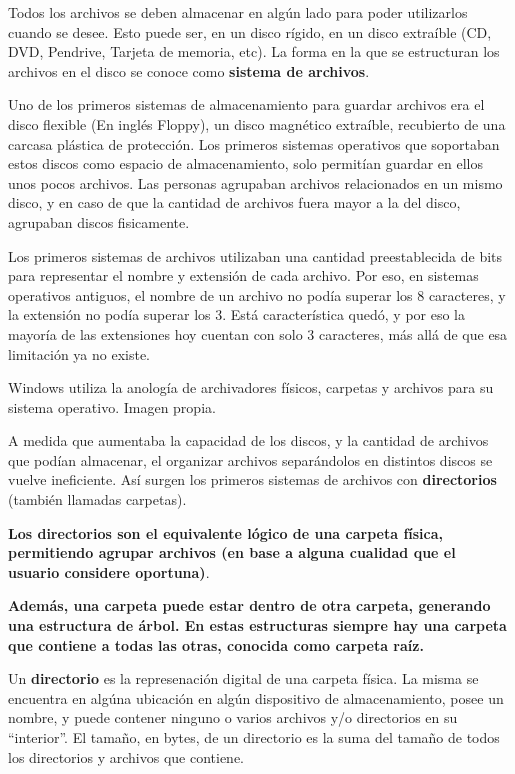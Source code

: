 Todos los archivos se deben almacenar en algún lado para poder utilizarlos
cuando se desee. Esto puede ser, en un disco rígido, en un disco extraíble
(CD, DVD, Pendrive, Tarjeta de memoria, etc). La forma en la que se estructuran
los archivos en el disco se conoce como \textbf{sistema de archivos}.

Uno de los primeros sistemas de almacenamiento para guardar archivos era el
disco flexible (En inglés Floppy), un disco magnético extraíble, recubierto de
una carcasa plástica de protección. Los primeros sistemas operativos que soportaban
estos discos como espacio de almacenamiento, solo permitían guardar en ellos unos
pocos archivos. Las personas agrupaban archivos relacionados en un mismo disco,
y en caso de que la cantidad de archivos fuera mayor a la del disco, agrupaban
discos fisicamente.

\begin{knowwhat}
Los primeros sistemas de archivos utilizaban una cantidad preestablecida de
bits para representar el nombre y extensión de cada archivo. Por eso,
en sistemas operativos antiguos, el nombre de un archivo no podía superar los
8 caracteres, y la extensión no podía superar los 3. Está característica quedó,
y por eso la mayoría de las extensiones hoy cuentan con solo 3 caracteres,
más allá de que esa limitación ya no existe.
\end{knowwhat}

{Windows utiliza la anología de archivadores físicos, carpetas y archivos
para su sistema operativo.}
{Imagen propia.}

A medida que aumentaba la capacidad de los discos, y la cantidad de archivos
que podían almacenar, el organizar archivos separándolos en distintos discos
se vuelve ineficiente. Así surgen los primeros sistemas de archivos con
\textbf{directorios} (también llamadas carpetas).

\textbf{Los directorios son el equivalente lógico de una carpeta física,
permitiendo agrupar archivos (en base a alguna cualidad que el usuario
considere oportuna)}.

\textbf{Además, una carpeta puede estar dentro de otra carpeta, generando una
estructura de árbol. En estas estructuras siempre hay una carpeta que contiene
a todas las otras, conocida como carpeta raíz.}

\begin{definition}
    Un \textbf{directorio} es la represenación digital de una carpeta física.
    La misma se encuentra en algúna ubicación en algún dispositivo de
    almacenamiento, posee un nombre, y puede contener ninguno o varios
    archivos y/o directorios en su ``interior''. El tamaño, en bytes, de un
    directorio es la suma del tamaño de todos los directorios y archivos que
    contiene.\autocite[part. IV]{gookin_2005}
\end{definition}

